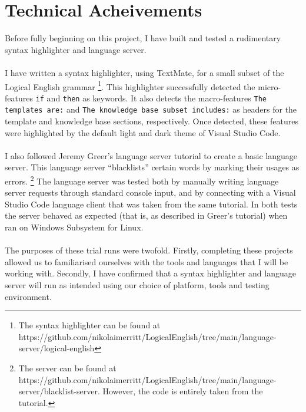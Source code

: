 \documentclass[../main.tex]{subfiles}
\begin{document}
\section*{Technical Acheivements}

Before fully beginning on this project, I have built and tested a rudimentary syntax highlighter and language server. 
\\ \\ 
I have written a syntax highlighter, using TextMate, for a small subset of the Logical English grammar \footnote{The syntax highlighter can be found at https://github.com/nikolaimerritt/LogicalEnglish/tree/main/language-server/logical-english}. This highlighter successfully detected the micro-features \texttt{if} and \texttt{then} as keywords. It also detects the macro-features \texttt{The templates are:} and \texttt{The knowledge base subset includes:} as headers for the template and knowledge base sections, respectively. Once detected, these features were highlighted by the default light and dark theme of Visual Studio Code. 
\\ \\ 
I also followed Jeremy Greer's language server tutorial \cite{blacklist_vscode_tutorial} to create a basic language server. This language server ``blacklists'' certain words by marking their usages as errors. \footnote{The server can be found at https://github.com/nikolaimerritt/LogicalEnglish/tree/main/language-server/blacklist-server. However, the code is entirely taken from the tutorial.} The language server was tested both by manually writing language server requests through standard console input, and by connecting with a Visual Studio Code language client that was taken from the same tutorial. In both tests the server behaved as expected (that is, as described in Greer's tutorial) when ran on Windows Subsystem for Linux. 
\\ \\ 
The purposes of these trial runs were twofold. Firstly, completing these projects allowed us to familiarised ourselves with the tools and languages that I will be working with. Secondly, I have confirmed that a syntax highlighter and language server will run as intended using our choice of platform, tools and testing environment. 
\end{document}
